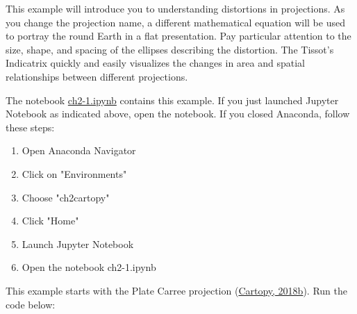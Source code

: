 \documentclass[a4paper , 12pt]{book}
\begin{document}
This example will introduce you to understanding distortions in projections. As you change the projection name, a different mathematical equation will be used to portray the round Earth in a flat presentation. Pay particular attention to the size, shape, and spacing of the ellipses describing the distortion. The Tissot’s Indicatrix quickly and easily visualizes the changes in area and spatial relationships between different projections.

The notebook \href{http://github.com}{ch2-1.ipynb} contains this example. If you just launched Jupyter Notebook as indicated above, open the notebook. If you closed Anaconda, follow these steps:

\begin{enumerate}
    \item Open Anaconda Navigator
    \item Click on "Environments"
    \item Choose "ch2cartopy"
    \item Click "Home"
    \item Launch Jupyter Notebook
    \item Open the notebook ch2-1.ipynb
\end{enumerate}{}

This example starts with the Plate Carree projection (\href{https://scitools.org.uk/cartopy/docs/latest/gallery/tissot.html}{Cartopy, 2018b}). Run the code below:
\end{document}
